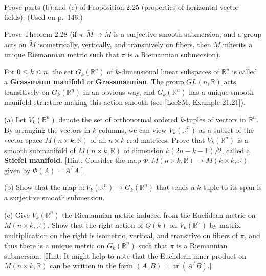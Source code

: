 \begin{exercise}\label{prob:horizontal-vector-fields}
\leanok
{}
Prove parts (b) and (c) of Proposition 2.25 (properties of horizontal vector fields). (Used on p.~146.)
\end{exercise}

\begin{exercise}\label{prob:riemannian-metric-submersion}
\leanok
{}
Prove Theorem 2.28 (if $\pi: \tilde{M} \to M$ is a surjective smooth submersion, and a group acts on $\tilde{M}$ isometrically, vertically, and transitively on fibers, then $M$ inherits a unique Riemannian metric such that $\pi$ is a Riemannian submersion).
\end{exercise}

\begin{exercise}\label{prob:grassmann-stiefel-manifolds}
For $0 \le k \le n$, the set $G_k(\mathbb{R}^n)$ of $k$-dimensional linear subspaces of $\mathbb{R}^n$ is called a \textbf{Grassmann manifold} or \textbf{Grassmannian}. The group $GL(n,\mathbb{R})$ acts transitively on $G_k(\mathbb{R}^n)$ in an obvious way, and $G_k(\mathbb{R}^n)$ has a unique smooth manifold structure making this action smooth (see [LeeSM, Example 21.21]).

(a) Let $V_k(\mathbb{R}^n)$ denote the set of orthonormal ordered $k$-tuples of vectors in $\mathbb{R}^n$. By arranging the vectors in $k$ columns, we can view $V_k(\mathbb{R}^n)$ as a subset of the vector space $M(n \times k, \mathbb{R})$ of all $n \times k$ real matrices. Prove that $V_k(\mathbb{R}^n)$ is a smooth submanifold of $M(n \times k, \mathbb{R})$ of dimension $k(2n - k - 1)/2$, called a \textbf{Stiefel manifold}. [Hint: Consider the map $\Phi: M(n \times k, \mathbb{R}) \to M(k \times k, \mathbb{R})$ given by $\Phi(A) = A^T A$.]

(b) Show that the map $\pi: V_k(\mathbb{R}^n) \to G_k(\mathbb{R}^n)$ that sends a $k$-tuple to its span is a surjective smooth submersion.

(c) Give $V_k(\mathbb{R}^n)$ the Riemannian metric induced from the Euclidean metric on $M(n \times k, \mathbb{R})$. Show that the right action of $O(k)$ on $V_k(\mathbb{R}^n)$ by matrix multiplication on the right is isometric, vertical, and transitive on fibers of $\pi$, and thus there is a unique metric on $G_k(\mathbb{R}^n)$ such that $\pi$ is a Riemannian submersion. [Hint: It might help to note that the Euclidean inner product on $M(n \times k, \mathbb{R})$ can be written in the form $(A,B) = \operatorname{tr}(A^T B)$.]
\end{exercise}

